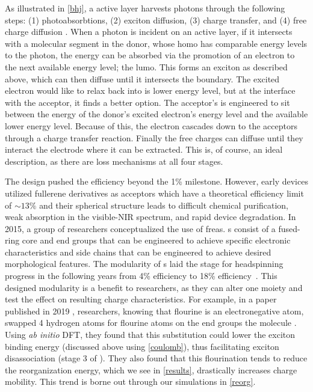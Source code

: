 As illustrated in \ref{bhj}, a  active layer harvests photons through the following 
steps: (1) photoabsorbtions, 
(2) exciton diffusion, (3) charge transfer, and (4) free charge diffusion \cite{Fusella2019}. 
When a photon is incident on
an  active layer, if it intersects with a molecular segment in the donor, whose 
\gls{homo} has comparable energy levels to the photon, 
the energy can be absorbed via the promotion of
an electron to the next available energy level; the \gls{lumo}.
This forms an exciton as
described above, which can then diffuse until it intersects the boundary. 
The excited electron would like to relax
back into is lower energy level, but at the interface with the acceptor, it finds a better option. 
The acceptor's  is engineered to sit between the energy of the donor's excited electron's energy level and the
available lower energy level. Because of this, the electron cascades down to the acceptors  through a charge
transfer reaction. Finally the free charges can diffuse until they interact the electrode where it can be
extracted. This is, of course, an ideal description, as there are loss mechanisms at all four stages. 

The  design pushed the efficiency beyond the 1\% milestone. However, early  devices utilized
fullerene derivatives as acceptors which have a theoretical efficiency limit of $\sim13\%$ \cite{Scharber2016}
and their spherical
structure leads to difficult chemical purification, weak absorption in the visible-NIR spectrum, and rapid
device degradation. In 2015, a group of researchers conceptualized the use of
\gls{frea}s. s consist of
a fused-ring core and end groups that can be engineered to achieve specific electronic characteristics and side
chains that can be engineered to achieve desired morphological features. The modularity of s
laid the stage for headspinning progress in the following years from 4\% efficiency to 18\% 
efficiency~\cite{Wang2021a}. 
This designed modularity is a benefit to researchers, as they can alter one moiety and test
the effect on resulting charge characteristics. For example, in a paper published in 2019 \cite{Benatto2019},
researchers, knowing that flourine is an electronegative atom, swapped 4 hydrogen atoms for flourine atoms on
the end groups the  molecule . Using \textit{ab initio} DFT, they found 
that this substitution could lower the exciton
binding energy (discussed above using \autoref{coulomb}), thus facilitating exciton disassociation (stage 3 of
). They also found
that this flourination tends to reduce the reorganization energy, which we see
in \autoref{results}, drastically increases charge mobility. This trend is borne out through our
simulations in \autoref{reorg}.

